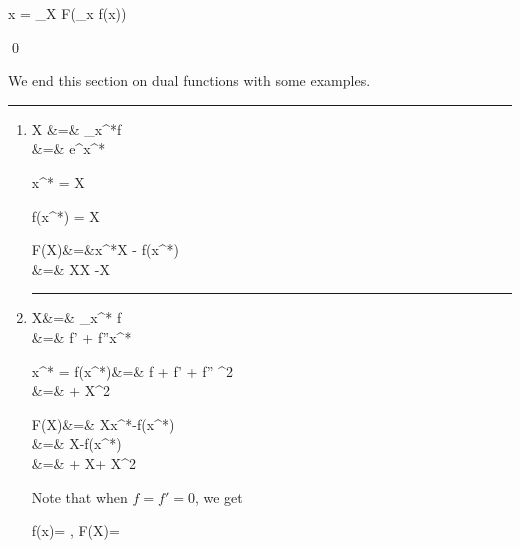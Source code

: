 \beq
x = \nabla_X F(\nabla_x f(x))
\eeq

\qed

We end this section
on dual functions with some
examples.
\hrule
\begin{enumerate}
\item

\beq
{}
\eeq

\beqa
X &=& \partial_{x^*}f
\\
&=&
e^{x^*}
\eeqa

\beq
x^* = \ln  X
\eeq

\beq
f(x^*) = X
\eeq

\beqa
F(X)&=&x^*X - f(x^*)
\\
&=&
X\ln X -X
\eeqa



\hrule
\item 
\beq
{}
\eeq

\beqa
X&=&
\partial_{x^*} f
\\
&=&
f' + f''x^*
\label{eq-X-xstar}
\eeqa

\beq
x^* = 
\eeq
\beqa
f(x^*)&=& f
+
f' 
+
f''
^2
\\
&=&
+
X^2
\eeqa

\beqa
F(X)&=&
Xx^*-f(x^*)
\\
&=&
X
-f(x^*)
\\
&=&
+
X
+
X^2
\eeqa

Note that when $f=f'=0$,
we get 

\beq
f(x)= 
,\quad 
F(X)= 
\eeq

%
%
%
%


\end{enumerate}
